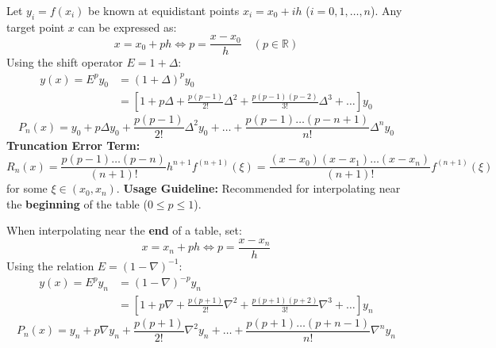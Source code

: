 \begin{theorembox}
Let $y_i = f(x_i)$ be known at equidistant points $x_i = x_0 + i h$ ($i = 0, 1, \dots, n$).
Any target point $x$ can be expressed as:
\begin{equation}
    x = x_0 + p h \iff \boxed{p = \frac{x - x_0}{h}} \quad (p \in \mathbb{R})
\end{equation}
Using the shift operator $E = 1 + \Delta$:
\begin{align}
    y(x) = E^p y_0 &= (1 + \Delta)^p y_0 \nonumber \\
    &= \left[ 1 + p \Delta + \frac{p(p-1)}{2!} \Delta^2 + \frac{p(p-1)(p-2)}{3!} \Delta^3 + \dots \right] y_0
\end{align}
\begin{equation}
    \boxed{P_n(x) = y_0 + p \Delta y_0 + \frac{p(p-1)}{2!} \Delta^2 y_0 + \dots + \frac{p(p-1)\dots(p-n+1)}{n!} \Delta^n y_0}
\end{equation}
\textbf{Truncation Error Term:}
\begin{equation}
    \boxed{R_n(x) = \frac{p(p-1)\dots(p-n)}{(n+1)!} h^{n+1} f^{(n+1)}(\xi) = \frac{(x - x_0)(x - x_1)\dots(x - x_n)}{(n+1)!} f^{(n+1)}(\xi)}
\end{equation}
for some $\xi \in (x_0, x_n)$.
\textbf{Usage Guideline:} Recommended for interpolating near the \textbf{beginning} of the table ($0 \le p \le 1$).
\end{theorembox}

\begin{theorembox}
When interpolating near the \textbf{end} of a table, set:
\begin{equation}
    x = x_n + p h \iff \boxed{p = \frac{x - x_n}{h}}
\end{equation}
Using the relation $E = (1 - \nabla)^{-1}$:
\begin{align}
    y(x) = E^p y_n &= (1 - \nabla)^{-p} y_n \nonumber \\
    &= \left[ 1 + p \nabla + \frac{p(p+1)}{2!} \nabla^2 + \frac{p(p+1)(p+2)}{3!} \nabla^3 + \dots \right] y_n
\end{align}
\begin{equation}
    \boxed{P_n(x) = y_n + p \nabla y_n + \frac{p(p+1)}{2!} \nabla^2 y_n + \dots + \frac{p(p+1)\dots(p+n-1)}{n!} \nabla^n y_n}
\end{equation}
\end{theorembox}

